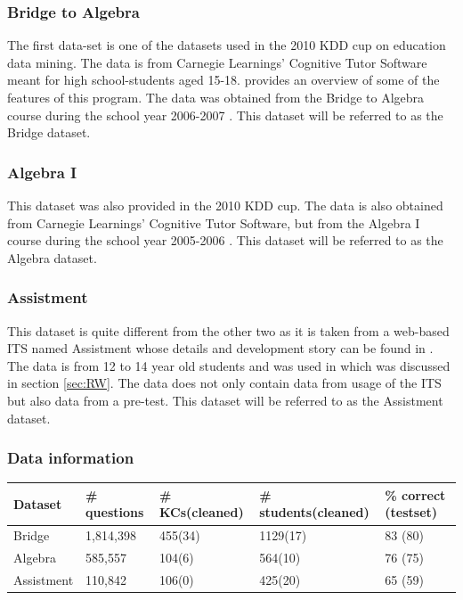 \documentclass{scrartcl}
\begin{document}
\subsubsection{Bridge to Algebra}
The first data-set is one of the datasets used in the 2010 KDD cup on education data mining. The data is from Carnegie Learnings' Cognitive Tutor Software meant for high school-students aged 15-18. \cite{ct} provides an overview of some of the features of this program. The data was obtained from the Bridge to Algebra course during the school year 2006-2007 \cite{bridge}. This dataset will be referred to as the Bridge dataset.

\subsubsection{Algebra I}
This dataset was also provided in the 2010 KDD cup. The data is also obtained from Carnegie Learnings' Cognitive Tutor Software, but from the Algebra I course during the school year 2005-2006 \cite{algebra}. This dataset will be referred to as the Algebra dataset.

\subsubsection{Assistment}
This dataset is quite different from the other two as it is taken from a web-based ITS named Assistment whose details and development story can be found in \cite{razzaq}. The data is from 12 to 14 year old students and was used in \cite{ktpfa} which was discussed in section \ref{sec:RW}. The data does not only contain data from usage of the ITS but also data from a pre-test. This dataset will be referred to as the Assistment dataset.

\subsubsection{Data information}
\begin{table}
    \begin{tabular}{| l | l | l | l |l|}
    \hline
    Dataset & \# questions & \# KCs(cleaned) &\# students(cleaned) & \% correct (testset) \\ \hline
    Bridge & 1,814,398 & 455(34) & 1129(17) & 83 (80)\\ \hline
    Algebra & 585,557 & 104(6) & 564(10) &  76 (75)\\ \hline
    Assistment & 110,842  & 106(0) & 425(20) & 65 (59)\\
    \hline
    \end{tabular}
\end{table} 
   
\end{document}
